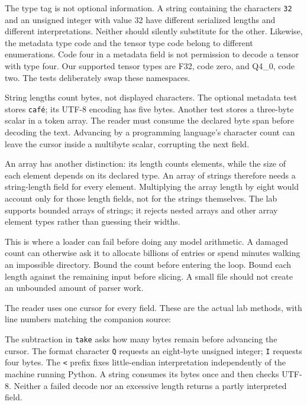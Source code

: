 The type tag is not optional information. A string containing the
characters \texttt{32} and an unsigned integer with value 32 have
different serialized lengths and different interpretations. Neither
should silently substitute for the other. Likewise, the metadata
type code and the tensor type code belong to different enumerations.
Code four in a metadata field is not permission to decode a tensor
with type four. Our supported tensor types are F32, code zero, and
Q4\_0, code two. The tests deliberately swap these namespaces.

String lengths count bytes, not displayed characters. The optional
metadata test stores \texttt{café}; its UTF-8 encoding has five bytes.
Another test stores a three-byte scalar in a token array. The reader
must consume the declared byte span before decoding the text. Advancing
by a programming language's character count can leave the cursor inside
a multibyte scalar, corrupting the next field.

An array has another distinction: its length counts elements, while
the size of each element depends on its declared type. An array of
strings therefore needs a string-length field for every element.
Multiplying the array length by eight would account only for those
length fields, not for the strings themselves. The lab supports bounded
arrays of strings; it rejects nested arrays and other array element
types rather than guessing their widths.

This is where a loader can fail before doing any model arithmetic.
A damaged count can otherwise ask it to allocate billions
of entries or spend minutes walking an impossible directory. Bound
the count before entering the loop. Bound each length against the
remaining input before slicing. A small file should not create an
unbounded amount of parser work.

The reader uses one cursor for every field. These are the actual lab
methods, with line numbers matching the companion source:
\par\medskip\noindent\begin{minipage}{\linewidth}
\end{minipage}\par\medskip
The subtraction in \texttt{take} asks how many bytes remain before
advancing the cursor. The format character \texttt{Q} requests an
eight-byte unsigned integer; \texttt{I} requests four bytes. The
\texttt{<} prefix fixes little-endian interpretation independently of
the machine running Python. A string consumes its bytes once and
then checks UTF-8. Neither a failed decode nor an excessive length
returns a partly interpreted field.

